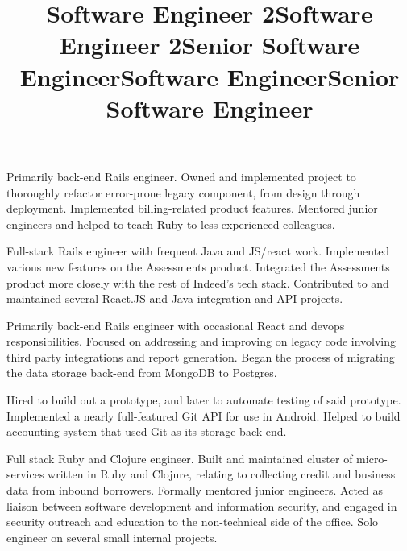 \documentclass[margin,line,letterpaper]{resume}
\begin{document}
\begin{resume}
  \title{\bf Software Engineer 2}
  \location{}
  \begin{position}
    Primarily back-end Rails engineer. Owned and implemented
    project to thoroughly refactor error-prone legacy component,
    from design through deployment. Implemented billing-related
    product features. Mentored junior engineers and helped
    to teach Ruby to less experienced colleagues.
  \end{position}

  \title{\bf Software Engineer 2}
  \location{}
  \begin{position}
    Full-stack Rails engineer with frequent Java and JS/react work.
    Implemented various new features on the Assessments product.
    Integrated the Assessments product more closely with the rest
    of Indeed's tech stack. Contributed to and maintained several
    React.JS and Java integration and API projects.
  \end{position}

  \title{\bf Senior Software Engineer}
  \location{}
  \begin{position}
    Primarily back-end Rails engineer with occasional React and
    devops responsibilities. Focused on addressing and improving on
    legacy code involving third party integrations and report
    generation. Began the process of migrating the data storage
    back-end from MongoDB to Postgres.
  \end{position}

  \title{\bf Software Engineer}
  \location{}
  \begin{position}
    Hired to build out a prototype, and later to automate testing of
    said prototype. Implemented a nearly full-featured Git API for use
    in Android. Helped to build accounting system that used Git as
    its storage back-end.
  \end{position}

  \title{\bf Senior Software Engineer}
  \location{}
  \begin{position}
    Full stack Ruby and Clojure engineer. Built and maintained
    cluster of micro-services written in Ruby and Clojure, relating
    to collecting credit and business data from inbound borrowers.
    Formally mentored junior engineers. Acted as liaison between
    software development and information security, and engaged in
    security outreach and education to the non-technical side of
    the office. Solo engineer on several small internal projects.
  \end{position}


\end{resume}
\end{document}
